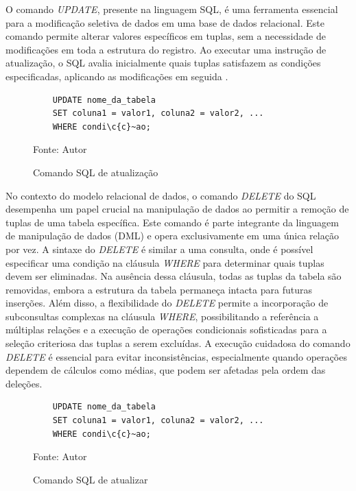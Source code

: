
O comando \textit{UPDATE}, presente na linguagem SQL, é uma ferramenta essencial para a modificação seletiva de dados em uma base de dados relacional. Este comando permite alterar valores específicos em tuplas, sem a necessidade de modificações em toda a estrutura do registro. Ao executar uma instrução de atualização, o SQL avalia inicialmente quais tuplas satisfazem as condições especificadas, aplicando as modificações em seguida \cite{silberschatz2011database}.

\begin{figure}[H]
    \centering
    \begin{lstlisting}
    UPDATE nome_da_tabela
    SET coluna1 = valor1, coluna2 = valor2, ...
    WHERE condi\c{c}~ao;
    \end{lstlisting}
    \caption{Comando SQL de atualização}
    Fonte: Autor
    \label{lst:update}
\end{figure}



No contexto do modelo relacional de dados, o comando \textit{DELETE} do SQL desempenha um papel crucial na manipulação de dados ao permitir a remoção de tuplas de uma tabela específica. Este comando é parte integrante da linguagem de manipulação de dados (DML) e opera exclusivamente em uma única relação por vez. A sintaxe do \textit{DELETE} é similar a uma consulta, onde é possível especificar uma condição na cláusula \textit{WHERE} para determinar quais tuplas devem ser eliminadas. Na ausência dessa cláusula, todas as tuplas da tabela são removidas, embora a estrutura da tabela permaneça intacta para futuras inserções. Além disso, a flexibilidade do \textit{DELETE} permite a incorporação de subconsultas complexas na cláusula \textit{WHERE}, possibilitando a referência a múltiplas relações e a execução de operações condicionais sofisticadas para a seleção criteriosa das tuplas a serem excluídas. A execução cuidadosa do comando \textit{DELETE} é essencial para evitar inconsistências, especialmente quando operações dependem de cálculos como médias, que podem ser afetadas pela ordem das deleções\cite{silberschatz2011database}.

\begin{figure}[H]
    \centering
    \begin{lstlisting}
    UPDATE nome_da_tabela
    SET coluna1 = valor1, coluna2 = valor2, ...
    WHERE condi\c{c}~ao;
    \end{lstlisting}
    \caption{Comando SQL de atualizar}
    Fonte: Autor
    \label{lst:delete}
\end{figure}

